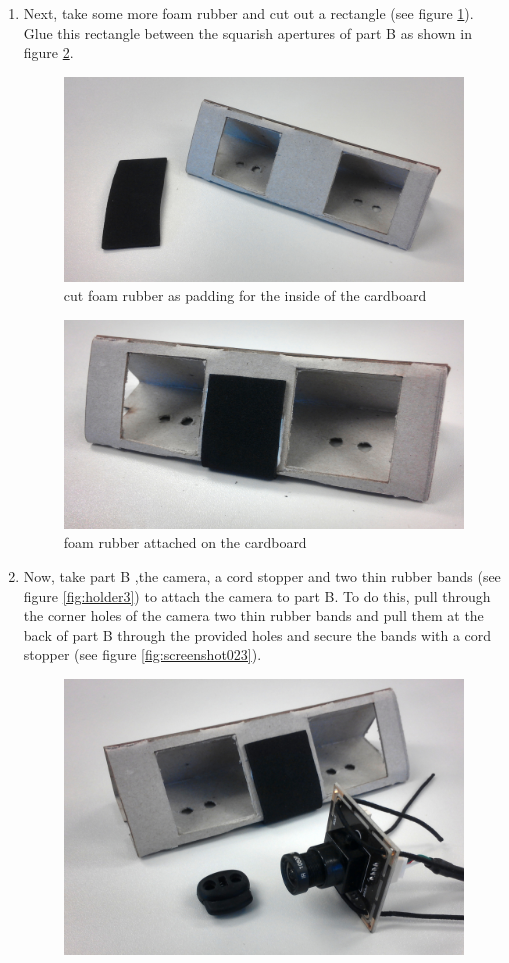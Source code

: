 \documentclass[../../Cardboard_Assembling]{subfiles}
\begin{document}
\begin{enumerate}
	\item Next, take some more foam rubber and cut out a rectangle (see figure \ref{fig:holder1}). Glue this rectangle between the squarish apertures of part B as shown in figure \ref{fig:holder2}.
	\begin{figure}[!htb]
		\centering
		\includegraphics[width=0.75\linewidth]{holder01}
		\caption{cut foam rubber as padding for the inside of the cardboard}
		\label{fig:holder1}
	\end{figure}
	\begin{figure}[!htb]
		\centering
		\includegraphics[width=0.75\linewidth]{holder02}
		\caption{foam rubber attached on the cardboard}
		\label{fig:holder2}
	\end{figure}
	\item Now, take part B ,the camera, a cord stopper and two thin rubber bands (see figure \ref{fig:holder3}) to attach the camera to part B. To do this, pull through the corner holes of the camera two thin rubber bands and pull them at the back of part B through the provided holes and secure the bands with a cord stopper (see figure \ref{fig:screenshot023}).
	\begin{figure}[htb]
		\centering
		\includegraphics[width=0.7\linewidth]{holder03}

\end{figure}
\end{enumerate}
\end{document}
